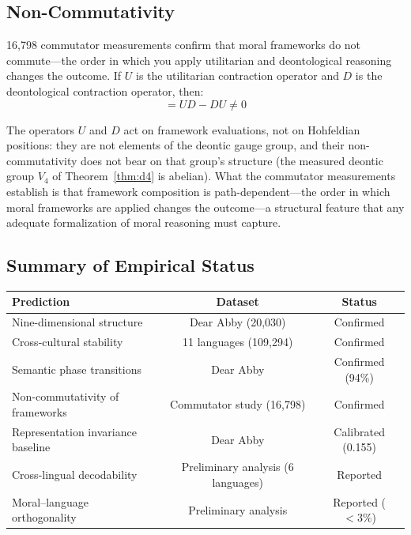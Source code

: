 \documentclass[12pt]{article}
\theoremstyle{definition}
\theoremstyle{remark}
\begin{document}
\subsection{Non-Commutativity}
\label{subsec:noncomm}

16,798 commutator measurements confirm that moral frameworks do not commute---the order in which you apply utilitarian and deontological reasoning changes the outcome. If $U$ is the utilitarian contraction operator and $D$ is the deontological contraction operator, then:
\begin{equation}
[U, D] = UD - DU \neq 0
\label{eq:commutator}
\end{equation}

The operators $U$ and $D$ act on framework evaluations, not on Hohfeldian positions: they are not elements of the deontic gauge group, and their non-commutativity does not bear on that group's structure (the measured deontic group $V_4$ of Theorem~\ref{thm:d4} is abelian). What the commutator measurements establish is that framework composition is path-dependent---the order in which moral frameworks are applied changes the outcome---a structural feature that any adequate formalization of moral reasoning must capture.

\subsection{Summary of Empirical Status}

\begin{center}
\begin{tabular}{lcc}
\toprule
\textbf{Prediction} & \textbf{Dataset} & \textbf{Status} \\
\midrule
Nine-dimensional structure & Dear Abby (20,030) & Confirmed \\
Cross-cultural stability & 11 languages (109,294) & Confirmed \\
Semantic phase transitions & Dear Abby & Confirmed (94\%) \\
Non-commutativity of frameworks & Commutator study (16,798) & Confirmed \\
Representation invariance baseline & Dear Abby & Calibrated (0.155) \\
Cross-lingual decodability & Preliminary analysis (6 languages) & Reported \\
Moral--language orthogonality & Preliminary analysis & Reported ($< 3\%$) \\
\bottomrule
\end{tabular}
\end{center}
\end{document}
